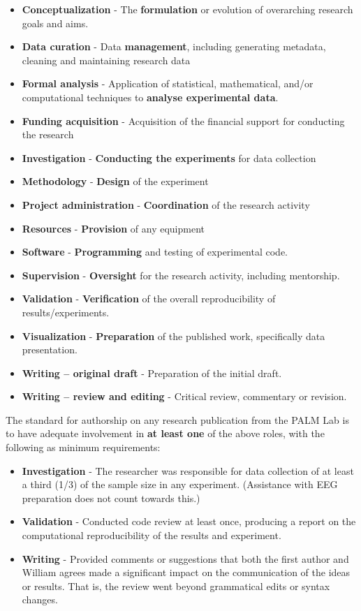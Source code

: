 \documentclass[
]{book}
\providecommand{\tightlist}{%
  \setlength{\itemsep}{0pt}\setlength{\parskip}{0pt}}
\begin{document}
\begin{itemize}
\tightlist
\item
  \textbf{Conceptualization} - The \textbf{formulation} or evolution of overarching research goals and aims.
\item
  \textbf{Data curation} - Data \textbf{management}, including generating metadata, cleaning and maintaining research data
\item
  \textbf{Formal analysis} - Application of statistical, mathematical, and/or computational techniques to \textbf{analyse experimental data}.
\item
  \textbf{Funding acquisition} - Acquisition of the financial support for conducting the research
\item
  \textbf{Investigation} - \textbf{Conducting the experiments} for data collection
\item
  \textbf{Methodology} - \textbf{Design} of the experiment
\item
  \textbf{Project administration} - \textbf{Coordination} of the research activity
\item
  \textbf{Resources} - \textbf{Provision} of any equipment
\item
  \textbf{Software} - \textbf{Programming} and testing of experimental code.
\item
  \textbf{Supervision} - \textbf{Oversight} for the research activity, including mentorship.
\item
  \textbf{Validation} - \textbf{Verification} of the overall reproducibility of results/experiments.
\item
  \textbf{Visualization} - \textbf{Preparation} of the published work, specifically data presentation.
\item
  \textbf{Writing -- original draft} - Preparation of the initial draft.
\item
  \textbf{Writing -- review and editing} - Critical review, commentary or revision.
\end{itemize}

The standard for authorship on any research publication from the PALM Lab is to have adequate involvement in \textbf{at least one} of the above roles, with the following as minimum requirements:

\begin{itemize}
\tightlist
\item
  \textbf{Investigation} - The researcher was responsible for data collection of at least a third (1/3) of the sample size in any experiment. (Assistance with EEG preparation does not count towards this.)
\item
  \textbf{Validation} - Conducted code review at least once, producing a report on the computational reproducibility of the results and experiment.
\item
  \textbf{Writing} - Provided comments or suggestions that both the first author and William agrees made a significant impact on the communication of the ideas or results. That is, the review went beyond grammatical edits or syntax changes.
\end{itemize}
\end{document}
